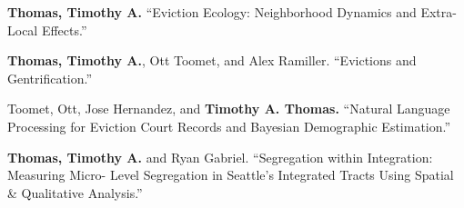 



\begin{cvparagraph}


\textbf{Thomas, Timothy A.} “Eviction Ecology: Neighborhood Dynamics and Extra-Local Effects.”

\end{cvparagraph}

\begin{cvparagraph}

\textbf{Thomas, Timothy A.}, Ott Toomet, and Alex Ramiller. “Evictions and Gentrification.”
\end{cvparagraph}

\begin{cvparagraph}

Toomet, Ott, Jose Hernandez, and \textbf{Timothy A. Thomas.} “Natural Language Processing for Eviction Court Records and Bayesian Demographic Estimation.”
\end{cvparagraph}



\begin{cvparagraph}

\textbf{Thomas, Timothy A.} and Ryan Gabriel. “Segregation within Integration: Measuring Micro- Level Segregation in Seattle's Integrated Tracts Using Spatial \& Qualitative Analysis.”
\end{cvparagraph}

